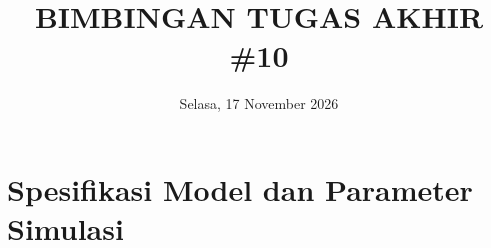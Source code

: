 \documentclass[11pt,a4paper]{article}
\title{
    \vspace{-1.6cm}
    \textbf{\Large BIMBINGAN TUGAS AKHIR \#10} \\[0.2em]
}
\author{}
\date{\vspace{-0.6cm} Selasa, 17 November 2026}
\theoremstyle{plain}
\theoremstyle{definition}
\theoremstyle{remark}
\begin{document}
\maketitle
\vspace{-1.1cm}
\setlength{\abovedisplayskip}{3pt}
\setlength{\belowdisplayskip}{3pt}
\setlength{\abovedisplayshortskip}{1pt}
\setlength{\belowdisplayshortskip}{1pt}

\section{Spesifikasi Model dan Parameter Simulasi}
\label{sec:spesifikasi_model}
\end{document}

